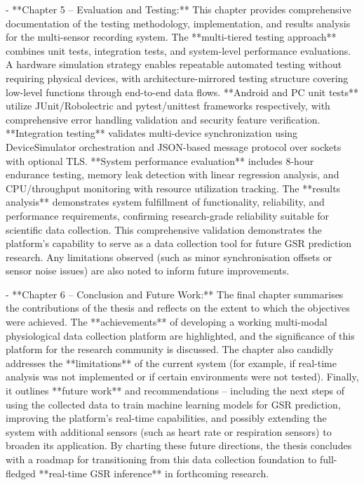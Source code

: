 \documentclass[12pt,a4paper]{article}
\begin{document}
- **Chapter 5 -- Evaluation and Testing:** This chapter provides
  comprehensive documentation of the testing methodology, implementation,
  and results analysis for the multi-sensor recording system. The
  **multi-tiered testing approach** combines unit tests, integration
  tests, and system-level performance evaluations. A hardware simulation
  strategy enables repeatable automated testing without requiring
  physical devices, with architecture-mirrored testing structure covering
  low-level functions through end-to-end data flows. **Android and PC
  unit tests** utilize JUnit/Robolectric and pytest/unittest frameworks
  respectively, with comprehensive error handling validation and security
  feature verification. **Integration testing** validates multi-device
  synchronization using DeviceSimulator orchestration and JSON-based
  message protocol over sockets with optional TLS. **System performance
  evaluation** includes 8-hour endurance testing, memory leak detection
  with linear regression analysis, and CPU/throughput monitoring with
  resource utilization tracking. The **results analysis** demonstrates
  system fulfillment of functionality, reliability, and performance
  requirements, confirming research-grade reliability suitable for
  scientific data collection. This comprehensive validation
  demonstrates the platform's capability to serve as a data collection
  tool for future GSR prediction research. Any limitations observed
  (such as minor synchronisation offsets or sensor noise issues) are
  also noted to inform future improvements.

- **Chapter 6 -- Conclusion and Future Work:** The final chapter
  summarises the contributions of the thesis and reflects on the extent
  to which the objectives were achieved. The **achievements** of
  developing a working multi-modal physiological data collection
  platform are highlighted, and the significance of this platform for
  the research community is discussed. The chapter also candidly
  addresses the **limitations** of the current system (for example, if
  real-time analysis was not implemented or if certain environments were
  not tested). Finally, it outlines **future work** and recommendations
  -- including the next steps of using the collected data to train
  machine learning models for GSR prediction, improving the platform's
  real-time capabilities, and possibly extending the system with
  additional sensors (such as heart rate or respiration sensors) to
  broaden its application. By charting these future directions, the
  thesis concludes with a roadmap for transitioning from this data
  collection foundation to full-fledged **real-time GSR inference** in
  forthcoming research.
\end{document}
